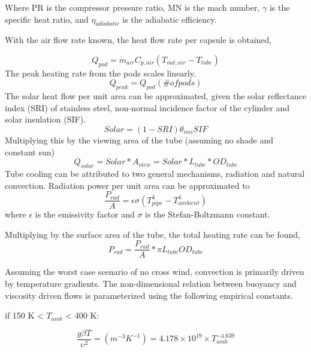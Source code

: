 \documentclass[heading.tex]{subfiles}
\begin{document}
Where PR is the compressor pressure ratio, MN is the mach number,  $\gamma$ is the specific heat ratio, and  ${\eta}_{adiabatic}$ is the adiabatic efficiency.

With the air flow rate known, the heat flow rate per capsule is obtained,

\begin{equation*}
{Q}_{pod}= \dot{m}_{air} C_{p,air} (T_{out, air} - T_{tube})
\end{equation*}
The peak heating rate from the pods scales linearly.
\begin{equation*}
{Q}_{peak}= Q_{pod} (\# ofpods)
\end{equation*}
The solar heat flow per unit area can be approximated, given the solar reflectance index (SRI) of stainless steel, non-normal incidence factor of the cylinder and solar insulation (SIF).
\begin{equation*}
Solar = (1-SRI) {\theta}_{nni} SIF
\end{equation*}
Multiplying this by the viewing area of the tube (assuming no shade and constant sun)
\begin{equation*}
Q_{solar} = Solar * A_{view} = Solar * L_{tube} * OD_{tube}
\end{equation*}
Tube cooling can be attributed to two general mechanisms, radiation and natural convection. Radiation power per unit area can be approximated to
\begin{equation*}
\frac{P_{rad}}{A} = \epsilon \sigma (T_{pipe}^4 - T_{ambient}^4)
\end{equation*}
where  $\epsilon$ is the emissivity factor and  $\sigma$ is the Stefan-Boltzmann constant.

Multiplying by the surface area of the tube, the total heating rate can be found,
\begin{equation*}
P_{rad} =  \frac{P_{rad}}{A} * \pi L_{tube} OD_{tube}
\end{equation*}

Assuming the worst case scenario of no cross wind, convection is primarily driven by temperature gradients. The non-dimensional relation between buoyancy and viscosity driven flows is parameterized using the following empirical constants. \cite{Berton} \cite{Incropera}

if 150 K <  $T_{amb}$ < 400 K:

\begin{equation*}
\frac{g \beta T} {\upsilon^2} = (m^{-3}K^{-1}) = 4.178\times10^{19} \times T_{amb}^{-4.639}
\end{equation*}
\end{document}
